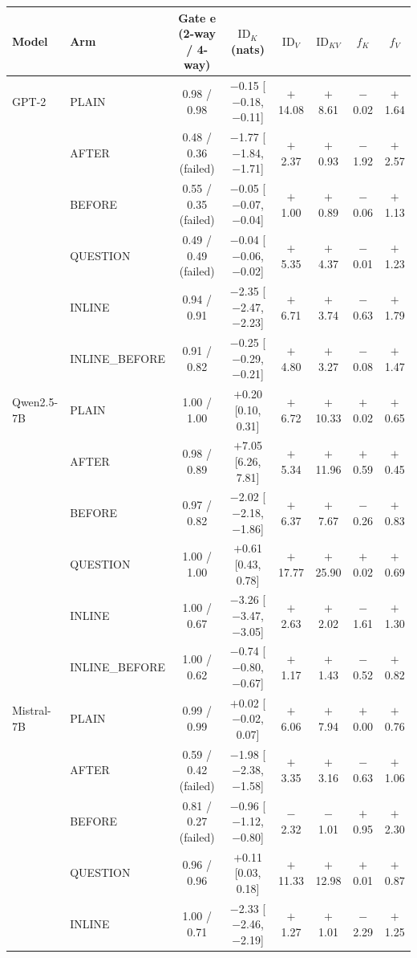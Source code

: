 \begin{tabular}{@{}llcccccc@{}}
\toprule
Model & Arm & Gate e (2-way / 4-way) & $\mathrm{ID}_K$ (nats) & $\mathrm{ID}_V$ & $\mathrm{ID}_{KV}$ & $f_K$ & $f_V$ \\
\midrule
GPT-2 & PLAIN & 0.98 / 0.98 & $-$0.15 [$-$0.18, $-$0.11] & $+$14.08 & $+$8.61 & $-$0.02 & $+$1.64 \\
 & AFTER & 0.48 / 0.36 (failed) & $-$1.77 [$-$1.84, $-$1.71] & $+$2.37 & $+$0.93 & $-$1.92 & $+$2.57 \\
 & BEFORE & 0.55 / 0.35 (failed) & $-$0.05 [$-$0.07, $-$0.04] & $+$1.00 & $+$0.89 & $-$0.06 & $+$1.13 \\
 & QUESTION & 0.49 / 0.49 (failed) & $-$0.04 [$-$0.06, $-$0.02] & $+$5.35 & $+$4.37 & $-$0.01 & $+$1.23 \\
 & INLINE & 0.94 / 0.91 & $-$2.35 [$-$2.47, $-$2.23] & $+$6.71 & $+$3.74 & $-$0.63 & $+$1.79 \\
 & INLINE\_BEFORE & 0.91 / 0.82 & $-$0.25 [$-$0.29, $-$0.21] & $+$4.80 & $+$3.27 & $-$0.08 & $+$1.47 \\
\midrule
Qwen2.5-7B & PLAIN & 1.00 / 1.00 & $+$0.20 [0.10, 0.31] & $+$6.72 & $+$10.33 & $+$0.02 & $+$0.65 \\
 & AFTER & 0.98 / 0.89 & $+$7.05 [6.26, 7.81] & $+$5.34 & $+$11.96 & $+$0.59 & $+$0.45 \\
 & BEFORE & 0.97 / 0.82 & $-$2.02 [$-$2.18, $-$1.86] & $+$6.37 & $+$7.67 & $-$0.26 & $+$0.83 \\
 & QUESTION & 1.00 / 1.00 & $+$0.61 [0.43, 0.78] & $+$17.77 & $+$25.90 & $+$0.02 & $+$0.69 \\
 & INLINE & 1.00 / 0.67 & $-$3.26 [$-$3.47, $-$3.05] & $+$2.63 & $+$2.02 & $-$1.61 & $+$1.30 \\
 & INLINE\_BEFORE & 1.00 / 0.62 & $-$0.74 [$-$0.80, $-$0.67] & $+$1.17 & $+$1.43 & $-$0.52 & $+$0.82 \\
\midrule
Mistral-7B & PLAIN & 0.99 / 0.99 & $+$0.02 [$-$0.02, 0.07] & $+$6.06 & $+$7.94 & $+$0.00 & $+$0.76 \\
 & AFTER & 0.59 / 0.42 (failed) & $-$1.98 [$-$2.38, $-$1.58] & $+$3.35 & $+$3.16 & $-$0.63 & $+$1.06 \\
 & BEFORE & 0.81 / 0.27 (failed) & $-$0.96 [$-$1.12, $-$0.80] & $-$2.32 & $-$1.01 & $+$0.95 & $+$2.30 \\
 & QUESTION & 0.96 / 0.96 & $+$0.11 [0.03, 0.18] & $+$11.33 & $+$12.98 & $+$0.01 & $+$0.87 \\
 & INLINE & 1.00 / 0.71 & $-$2.33 [$-$2.46, $-$2.19] & $+$1.27 & $+$1.01 & $-$2.29 & $+$1.25 \\

\end{tabular}
